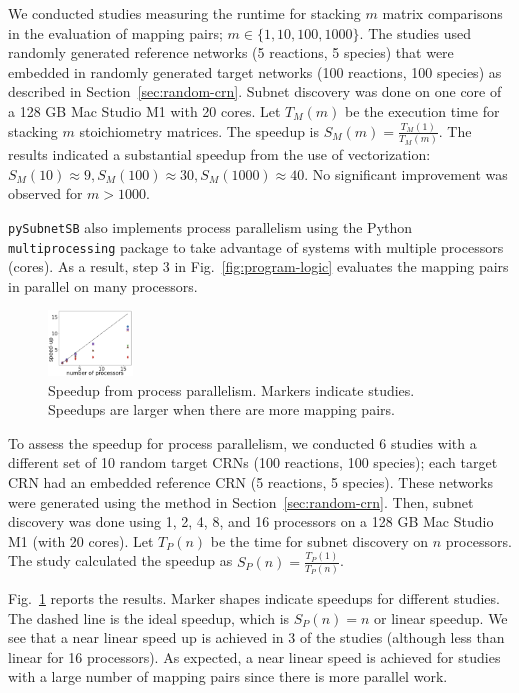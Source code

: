 \documentclass[webpdf,contemporary,large]{oup-authoring-template}
\newcommand{\fig}[1]{
  Fig.~\ref{#1}}
\newcommand{\secref}[1]{Section~\ref{#1}}
\newcommand{\py}{\texttt{pySubnetSB}}
\theoremstyle{thmstyleone}%
\theoremstyle{thmstyletwo}%
\theoremstyle{thmstylethree}%
\begin{document}
We conducted studies measuring the runtime for stacking $m$ matrix comparisons in the evaluation of mapping pairs;
$m \in \{ 1, 10, 100, 1000 \}$.
The studies used randomly generated reference networks (5 reactions, 5 species) that were embedded in randomly generated target networks (100 reactions, 100 species) as described in \secref{sec:random-crn}.
Subnet discovery was done on one core of a 128 GB Mac Studio M1 with 20 cores.
Let $T_M(m)$ be the execution time for stacking $m$ stoichiometry matrices.
The speedup is $S_M(m) =\frac{T_M(1)}{T_M(m)}$.
The results indicated a substantial speedup from the use of vectorization:
$S_M(10) \approx 9, S_M(100) \approx 30, S_M(1000) \approx 40$. No significant improvement was observed for $m > 1000$.

\py{} also implements process parallelism using the Python \texttt{multiprocessing} package to take advantage of systems with multiple processors (cores).
As a result,
step 3 in \fig{fig:program-logic}
evaluates the mapping pairs in parallel on many processors.

\begin{figure}
\hspace{0.2in}
\centering
\includegraphics[width=0.2\textwidth, angle=0]{figures/speedup.png}
\caption{Speedup from process parallelism. Markers indicate studies. Speedups are larger when there are more mapping pairs.}
\label{fig:speedup}
\end{figure}

To assess the speedup for process parallelism, we conducted 6 studies with a different set of 10 random target CRNs (100 reactions, 100 species); each target CRN had an embedded reference CRN (5 reactions, 5 species). These networks were generated using the method in \secref{sec:random-crn}.
Then, subnet discovery was done using 1, 2, 4, 8, and 16 processors on a 128 GB Mac Studio M1 (with 20 cores).
Let $T_P(n)$ be the time for subnet discovery on $n$ processors.
The study calculated the speedup as $S_P(n) = \frac{T_P(1)}{T_P(n)}$.
\fig{fig:speedup} reports the results.
Marker shapes indicate speedups for different studies.
The dashed line is the ideal speedup, which is $S_P(n) = n$  or linear speedup.
We see that a near linear speed up is achieved in 3 of the studies (although less than linear for 16 processors).
As expected, a
near linear speed is achieved for studies with a large number of mapping pairs since there is more parallel work.
\end{document}
